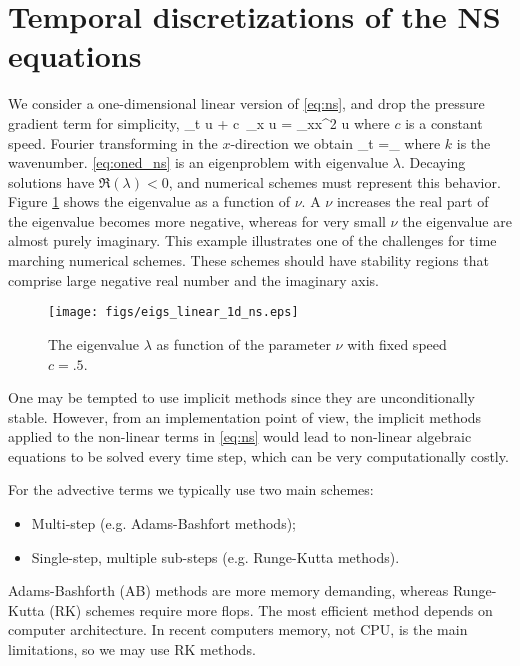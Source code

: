 \documentclass[11pt]{article}
\begin{document}
\section{Temporal discretizations of the NS equations}
We consider a one-dimensional linear version of \eqref{eq:ns}, and drop the pressure gradient term for simplicity,
\beq
\label{eq:oned_ns}
\p_t u + c \,\p_x u = \nu \p_{xx}^2 u\com
\eeq
where $c$ is a constant speed. Fourier transforming in the $x$-direction we obtain
\beq
\label{eq:oned_ns_h}
\p_t =_{ \lambda} \com
\eeq
where $k$ is the wavenumber. \eqref{eq:oned_ns} is an eigenproblem with eigenvalue $\lambda$. Decaying solutions have $\Re\left(\lambda\right) < 0$, and numerical schemes must represent this behavior. Figure \ref{fig:eigs_nu} shows the eigenvalue as a function of $\nu$. A $\nu$ increases the real part of the eigenvalue becomes more negative, whereas for very small $\nu$ the eigenvalue are almost purely imaginary. This example illustrates one of the challenges for time marching numerical schemes. These schemes should have stability regions that comprise large negative real number and the imaginary axis. 

\begin{figure}[ht]
\begin{center}
\texttt{[image: figs/eigs\_linear\_1d\_ns.eps]}
\end{center}
\caption{The eigenvalue $\lambda$ as function of the parameter $\nu$ with fixed speed $c = .5$.}
\label{fig:eigs_nu}
\end{figure}

One may be tempted to use implicit methods since they are unconditionally stable. However, from an implementation point of view, the implicit methods applied to the non-linear terms in \eqref{eq:ns} would lead to non-linear algebraic equations to be solved every time step, which can be very computationally costly. 

For the advective terms we typically use two main schemes:

\begin{itemize}
\item Multi-step (e.g. Adams-Bashfort methods);
    \item Single-step, multiple sub-steps (e.g. Runge-Kutta methods).
\end{itemize}
Adams-Bashforth (AB) methods are more memory demanding, whereas Runge-Kutta (RK) schemes require more flops. The most efficient method depends on computer architecture. In recent computers memory, not CPU, is the main limitations, so we may use RK methods.
\end{document}
